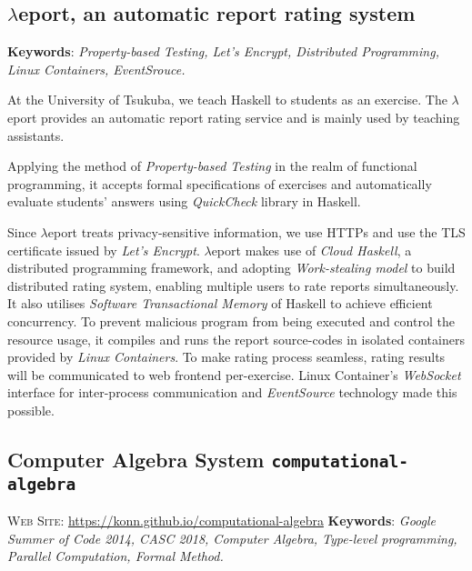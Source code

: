 \documentclass[letterpaper]{scrartcl}
\newcommand{\leport}{$\lambda$eport}
\begin{document}
\subsection*{\leport, an automatic report rating system}
 \vspace{-.5em}\noindent \textbf{Keywords}: \emph{Property-based Testing, Let's Encrypt, Distributed Programming, Linux Containers, EventSrouce.}

 \vspace{.5em}
 At the University of Tsukuba, we teach Haskell to students as an exercise.
 The \leport{} provides an automatic report rating service and is mainly used by teaching assistants.

 Applying the method of \emph{Property-based Testing} in the realm of functional programming, it accepts formal specifications of exercises and automatically evaluate students' answers using \emph{QuickCheck} library in Haskell.

 Since \leport{} treats privacy-sensitive information, we use HTTPs and use the TLS certificate issued by \emph{Let's Encrypt}.
 \leport{} makes use of \emph{Cloud Haskell}, a distributed programming framework, and adopting \emph{Work-stealing model} to build distributed rating system, enabling multiple users to rate reports simultaneously.
 It also utilises \emph{Software Transactional Memory} of Haskell to achieve efficient concurrency.
 To prevent malicious program from being executed and control the resource usage, it compiles and runs the report source-codes in isolated containers provided by \emph{Linux Containers}.
 To make rating process seamless, rating results will be communicated to web frontend per-exercise.
 Linux Container's \emph{WebSocket} interface for inter-process communication and \emph{EventSource} technology made this possible.

 \subsection*{Computer Algebra System \texttt{computational-algebra}}
 \vspace{-.5em}\noindent
 \textsc{Web Site}: \url{https://konn.github.io/computational-algebra}\newline
 \textbf{Keywords}: \emph{Google Summer of Code 2014, CASC 2018, Computer Algebra, Type-level programming, Parallel Computation, Formal Method.}
\end{document}
